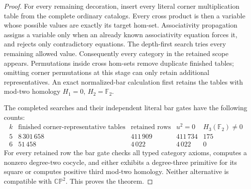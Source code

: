 \begin{proof}
For every remaining decoration, insert every literal corner
multiplication table from the complete ordinary catalogs.
Every cross product is then a variable whose possible values
are exactly its target hom-set.  Associativity propagation
assigns a variable only when an already known associativity
equation forces it, and rejects only contradictory equations.
The depth-first search tries every remaining allowed value.
Consequently every category in the retained scope appears.
Permutations inside cross hom-sets remove duplicate finished
tables; omitting corner permutations at this stage can only
retain additional representatives.  An exact normalized-bar
calculation first retains the tables with mod-two homology
$H_1=0$, $H_2=\mathbb F_2$.

The completed searches and their independent literal bar gates
have the following counts:
\[
\begin{array}{c|r|r|r|r}
 k&\text{finished corner-representative tables}&
 \text{retained rows}&u^2=0&H_3(\mathbb F_2)\ne0\\ \hline
 5&8\,301\,658&411\,909&411\,734&175\\
 6&51\,458&4\,022&4\,022&0
\end{array}
\]
For every retained row the bar gate checks all typed category
axioms, computes a nonzero degree-two cocycle, and either
exhibits a degree-three primitive for its square or computes
positive third mod-two homology.  Neither alternative is
compatible with $\mathbb {CP}^2$.  This proves the theorem.
\end{proof}

